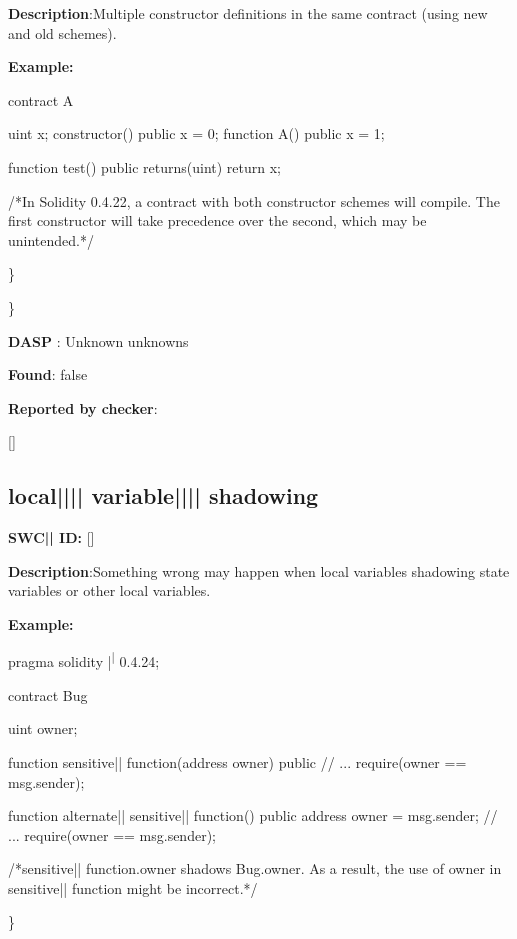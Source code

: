 \documentclass{article}
\begin{document}
\textbf{Description}:Multiple constructor definitions in the same contract (using new and old schemes).


\textbf{Example:} 
\begin{ffcode} 

contract A {
    uint x;
    constructor() public {
        x = 0;
    }
    function A() public {
        x = 1;
    }

    function test() public returns(uint) {
        return x;
    }
}

 /*In Solidity 0.4.22, a contract with both constructor schemes will compile. The first constructor will take precedence over the second, which may be unintended.*/ 

\end{ffcode} 
\} 

\} 

\textbf{DASP} : Unknown unknowns

\textbf{Found}: false

\textbf{Reported by checker}: 
\begin{ffcode} 

[]
\end{ffcode} 
\subsection{local{||\textunderscore|| }variable{||\textunderscore|| }shadowing} 
\textbf{SWC{|\textunderscore| }ID:} []

\textbf{Description}:Something wrong may happen when local variables shadowing state variables or other local variables.


\textbf{Example:} 
\begin{ffcode} 

pragma solidity |\textsuperscript| 0.4.24;

contract Bug {
    uint owner;

    function sensitive|\textunderscore| function(address owner) public {
        // ...
        require(owner == msg.sender);
    }

    function alternate|\textunderscore| sensitive|\textunderscore| function() public {
        address owner = msg.sender;
        // ...
        require(owner == msg.sender);
    }
}

 /*sensitive|\textunderscore| function.owner shadows Bug.owner. As a result, the use of owner in sensitive|\textunderscore| function might be incorrect.*/ 

\end{ffcode} 
\} 
\end{document}

